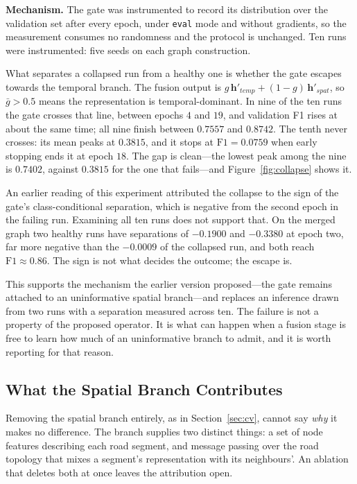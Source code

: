 \documentclass[journal]{IEEEtran}
\begin{document}
\textbf{Mechanism.} The gate was instrumented to record its distribution
over the validation set after every epoch, under \texttt{eval} mode and
without gradients, so the measurement consumes no randomness and the protocol
is unchanged. Ten runs were instrumented: five seeds on each graph
construction.

What separates a collapsed run from a healthy one is whether the gate escapes
towards the temporal branch. The fusion output is
$g\,\mathbf{h}'_{temp} + (1-g)\,\mathbf{h}'_{spat}$, so $\bar{g} > 0.5$ means
the representation is temporal-dominant. In nine of the ten runs the gate
crosses that line, between epochs $4$ and $19$, and validation F1 rises at
about the same time; all nine finish between $0.7557$ and $0.8742$. The tenth
never crosses: its mean peaks at $0.3815$, and it stops at
$\mathrm{F1} = 0.0759$ when early stopping ends it at epoch $18$. The gap is
clean---the lowest peak among the nine is $0.7402$, against $0.3815$ for the
one that fails---and Figure~\ref{fig:collapse} shows it.

An earlier reading of this experiment attributed the collapse to the sign of
the gate's class-conditional separation, which is negative from the second
epoch in the failing run. Examining all ten runs does not support that. On
the merged graph two healthy runs have separations of $-0.1900$ and $-0.3380$
at epoch two, far more negative than the $-0.0009$ of the collapsed run, and
both reach $\mathrm{F1} \approx 0.86$. The sign is not what decides the
outcome; the escape is.

This supports the mechanism the earlier version proposed---the gate remains
attached to an uninformative spatial branch---and replaces an inference drawn
from two runs with a separation measured across ten. The failure is not a
property of the proposed operator. It is what can happen when a fusion stage
is free to learn how much of an uninformative branch to admit, and it is
worth reporting for that reason.

\subsection{What the Spatial Branch Contributes}
\label{sec:graph_controls}
Removing the spatial branch entirely, as in Section~\ref{sec:cv}, cannot say
\emph{why} it makes no difference. The branch supplies two distinct things: a
set of node features describing each road segment, and message passing over
the road topology that mixes a segment's representation with its neighbours'.
An ablation that deletes both at once leaves the attribution open.
\end{document}
